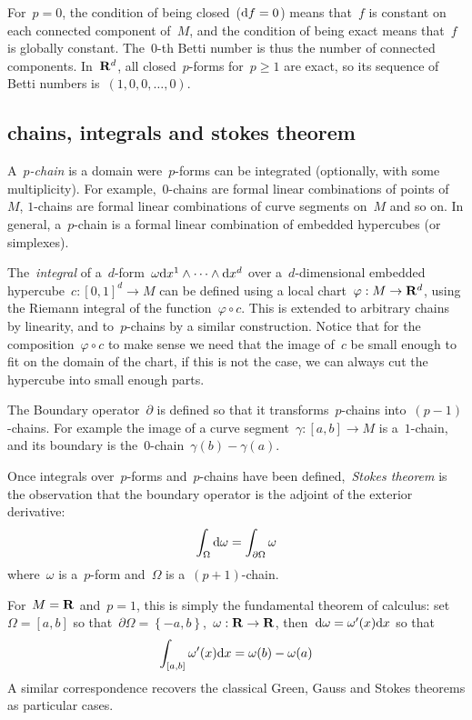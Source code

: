 For~$p=0$,
the condition of being closed~($\mathrm{d} f=0$) means that~$f$ is constant on each
connected component of~$M$, and the condition of being exact means
that~$f$ is globally constant.  The~$0$-th Betti  number is thus the number
of connected components.
In~$\mathbf{R}^d$, all closed~$p$-forms for~$p\ge1$ are exact, so its sequence of
Betti numbers is~$(1,0,0,\ldots,0)$.

\subsection{chains, integrals and stokes theorem}

A~\emph{$p$-chain} is a domain were~$p$-forms can be integrated (optionally,
with some multiplicity).  For example,~$0$-chains are formal linear
combinations of points of~$M$, $1$-chains are formal linear combinations of
curve segments on~$M$ and so on.  In general, a~$p$-chain is a formal linear
combination of embedded hypercubes (or simplexes).

The~\emph{integral} of a~$d$-form~$\omega\mathrm{d} x^1\wedge\cdots\wedge\mathrm{d} x^d$
over a~$d$-dimensional embedded hypercube~$c:[0,1]^d\to M$ can be defined
using a local chart~$\varphi:M\to\mathbf{R}^d$, using the Riemann integral of the
function~$\varphi\circ c$.  This is extended to arbitrary chains by
linearity, and to~$p$-chains by a similar construction.  Notice that for the
composition~$\varphi\circ c$ to make sense we need that the image of~$c$ be
small enough to fit on the domain of the chart, if this is not the case, we
can always cut the hypercube into small enough parts.

The Boundary operator~$\partial$ is defined so that it transforms~$p$-chains
into~$(p-1)$-chains.  For example the image of a curve
segment~$\gamma:[a,b]\to M$ is a~$1$-chain, and its boundary is
the~$0$-chain~$\gamma(b)-\gamma(a)$.

Once integrals over~$p$-forms and~$p$-chains have been defined,~\emph{Stokes
theorem} is the observation that the boundary operator is the adjoint of the
exterior derivative:
\[
	\int_\Omega\mathrm{d}\omega=\int_{\partial\Omega}\omega
\]
where~$\omega$ is a~$p$-form and~$\Omega$ is a~$(p+1)$-chain.

For~$M=\mathbf{R}$ and~$p=1$, this is simply the fundamental theorem of calculus:
set~$\Omega=[a,b]$ so
that~$\partial\Omega=\left\{-a,b\right\}$,~$\omega:\mathbf{R}\to\mathbf{R}$,
then~$\mathrm{d}\omega=\omega'(x)\mathrm{d} x$ so that
\[
	\int_{[a,b]}\omega'(x)\mathrm{d} x = \omega(b)-\omega(a)
\]
A similar correspondence recovers the classical Green, Gauss and Stokes
theorems as particular cases.

